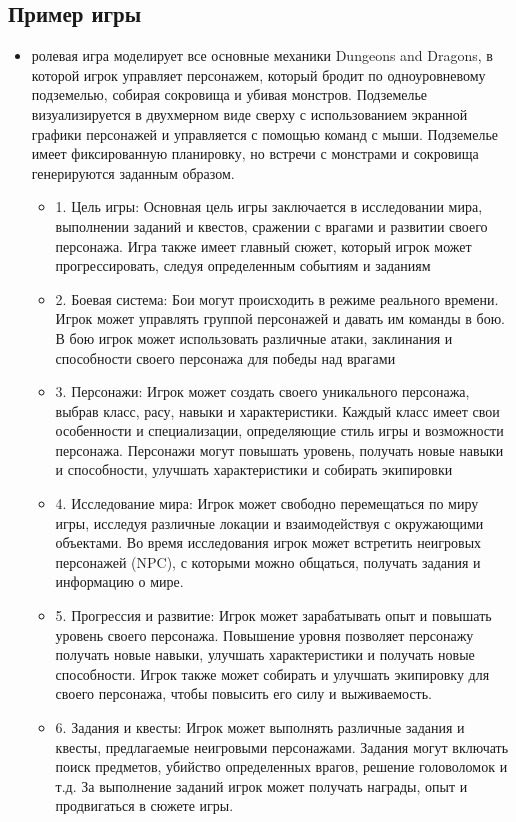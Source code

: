 \subsection{Пример игры}
 \begin{itemize}
 	\item ролевая игра моделирует все основные механики Dungeons and Dragons, в которой игрок управляет персонажем, который бродит по одноуровневому подземелью, собирая сокровища и убивая монстров. Подземелье визуализируется в двухмерном виде сверху с использованием экранной графики персонажей и управляется с помощью команд с мыши. Подземелье имеет фиксированную планировку, но встречи с монстрами и сокровища генерируются заданным образом.
 	\begin{itemize}
 		\item 1. Цель игры: Основная цель игры заключается в исследовании мира, выполнении заданий и квестов, сражении с врагами и развитии своего персонажа. Игра также имеет главный сюжет, который игрок может прогрессировать, следуя определенным событиям и заданиям
 		\item 2. Боевая система:  Бои могут происходить в режиме реального времени. Игрок может управлять группой персонажей и давать им команды в бою. В бою игрок может использовать различные атаки, заклинания и способности своего персонажа для победы над врагами
 		\item 3. Персонажи: Игрок может создать своего уникального персонажа, выбрав класс, расу, навыки и характеристики. Каждый класс имеет свои особенности и специализации, определяющие стиль игры и возможности персонажа. Персонажи могут повышать уровень, получать новые навыки и способности, улучшать характеристики и собирать экипировки
 		\item 4. Исследование мира: Игрок может свободно перемещаться по миру игры, исследуя различные локации и взаимодействуя с окружающими объектами. Во время исследования игрок может встретить неигровых персонажей (NPC), с которыми можно общаться, получать задания и информацию о мире.
 		\item 5. Прогрессия и развитие: Игрок может зарабатывать опыт и повышать уровень своего персонажа. Повышение уровня позволяет персонажу получать новые навыки, улучшать характеристики и получать новые способности. Игрок также может собирать и улучшать экипировку для своего персонажа, чтобы повысить его силу и выживаемость.
 		\item 6. Задания и квесты: Игрок может выполнять различные задания и квесты, предлагаемые неигровыми персонажами. Задания могут включать поиск предметов, убийство определенных врагов, решение головоломок и т.д. За выполнение заданий игрок может получать награды, опыт и продвигаться в сюжете игры.
 	\end{itemize}
 \end{itemize}
 
